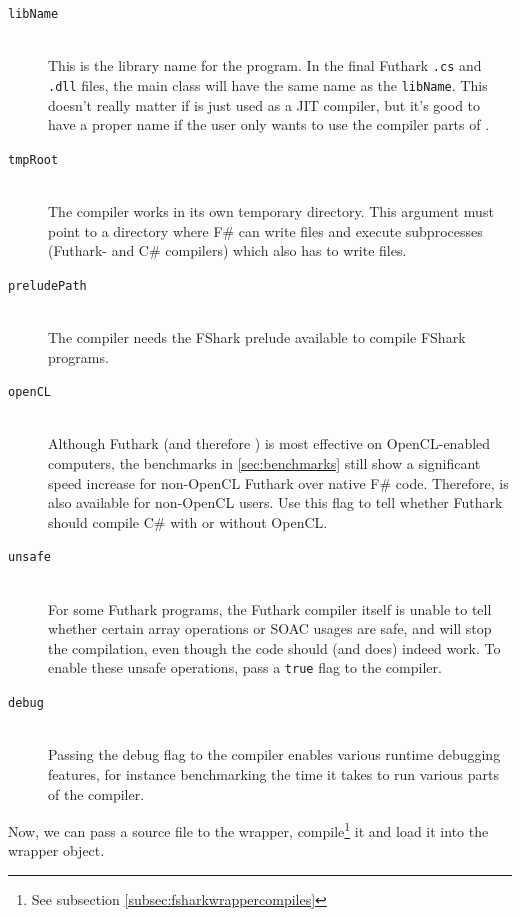 \begin{description}
\item[\texttt{libName}]\hfill\\
  This is the library name for the \fshark{} program. In the final Futhark
  \texttt{.cs} and \texttt{.dll} files, the main class will have the same name
  as the \texttt{libName}. This doesn't really matter if \fshark{} is just used
  as a JIT compiler, but it's good to have a proper name if the user only wants
  to use the compiler parts of \fshark{}.

\item[\texttt{tmpRoot}]\hfill\\
  The \fshark{} compiler works in its own temporary directory. This argument must
  point to a directory where F\# can write files and execute subprocesses
  (Futhark- and C\# compilers) which also has to write files.
  
\item[\texttt{preludePath}]\hfill\\
  The \fshark{} compiler needs the FShark prelude available to compile FShark
  programs. 

\item[\texttt{openCL}]\hfill\\
  Although Futhark (and therefore \fshark{}) is most effective on OpenCL-enabled
  computers, the benchmarks in \ref{sec:benchmarks} still show a significant
  speed increase for non-OpenCL Futhark over native F\# code.
  Therefore, \fshark{} is also available for non-OpenCL users. Use this flag to
  tell \fshark{} whether Futhark should compile C\# with or without OpenCL.
  
\item[\texttt{unsafe}]\hfill\\
  For some Futhark programs, the Futhark compiler itself is unable to tell
  whether certain array operations or SOAC usages are safe, and will stop the
  compilation, even though the code should (and does) indeed work.
  To enable these unsafe operations, pass a \texttt{true} flag to the compiler.

\item[\texttt{debug}]\hfill\\
  Passing the debug flag to the \fshark{} compiler enables various runtime
  debugging features, for instance benchmarking the time it takes to run various
  parts of the compiler.
\end{description}

Now, we can pass a source file to the \fshark{} wrapper, compile\footnote{See
  subsection \ref{subsec:fsharkwrappercompiles}} it and load it into the \fshark{} wrapper object.

